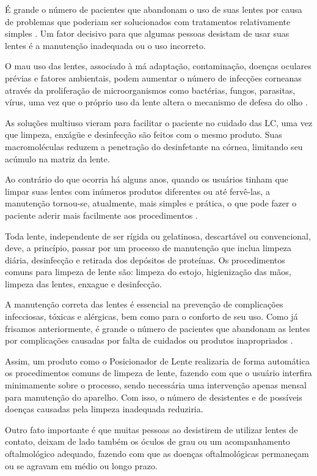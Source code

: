 É grande o número de pacientes que abandonam o uso de suas lentes
por causa de problemas que poderiam ser solucionados com tratamentos
relativamente simples \cite{vieira}. Um fator decisivo para que algumas
pessoas desistam de usar suas lentes é a manutenção inadequada ou o uso
incorreto. 

O mau uso das lentes, associado à má adaptação, contaminação, doenças
oculares prévias e fatores ambientais, podem aumentar o número de
infecções corneanas através da proliferação de microorganismos como
bactérias, fungos, parasitas, vírus, uma vez que o próprio uso da lente
altera o mecanismo de defesa do olho \cite{robert}.

As soluções multiuso vieram para facilitar o paciente no
cuidado das LC, uma vez que limpeza, enxágüe e desinfecção
são feitos com o mesmo produto. Suas macromoléculas reduzem
a penetração do desinfetante na córnea, limitando seu
acúmulo na matriz da lente.

Ao contrário do que ocorria há alguns anos, quando os
usuários tinham que limpar suas lentes com inúmeros produtos
diferentes ou até fervê-las, a manutenção tornou-se, atualmente,
mais simples e prática, o que pode fazer o paciente
aderir mais facilmente aos procedimentos \cite{rakow}.

Toda lente, independente de ser rígida ou gelatinosa,
descartável ou convencional, deve, a princípio, passar por
um processo de manutenção que inclua limpeza diária, desinfecção
e retirada dos depósitos de proteínas. Os procedimentos comuns para limpeza de lente são: limpeza do estojo, higienização das mãos, limpeza das lentes, enxague e desinfecção.

A manutenção correta das lentes é essencial na prevenção
de complicações infecciosas, tóxicas e alérgicas, bem como
para o conforto de seu uso. Como já frisamos anteriormente, é
grande o número de pacientes que abandonam as lentes por
complicações causadas por falta de cuidados ou produtos
inapropriados \cite{moreira}.

Assim, um produto como o Posicionador de Lente realizaria de forma automática os procedimentos comuns de limpeza de lente, fazendo com que o usuário interfira minimamente sobre o processo, sendo necessária uma intervenção apenas mensal para manutenção do aparelho. Com isso, o número de desistentes e de possíveis doenças causadas pela limpeza inadequada reduziria.

Outro fato importante é que muitas pessoas ao desistirem de utilizar lentes de contato, deixam de lado também os óculos de grau ou um acompanhamento oftalmológico adequado, fazendo com que as doenças oftalmológicas permaneçam ou se agravam em médio ou longo prazo. 

